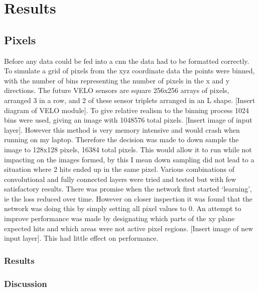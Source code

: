 \chapter{Results}


\graphicspath{{Figs/}}


\section{Pixels} %
Before any data could be fed into a cnn the data had to be formatted correctly. To simulate a grid of pixels from the xyz coordinate data the points were binned, with the number of bins representing the number of pixels in the x and y directions. The future VELO sensors are square 256x256 arrays of pixels, arranged 3 in a row, and 2 of these sensor triplets arranged in an L shape. [Insert diagram of VELO module]. To give relative realism to the binning process 1024 bins were used, giving an image with 1048576 total pixels. [Insert image of input layer]. However this method is very memory intensive and would crash when running on my laptop. Therefore the decision was made to down sample the image to 128x128 pixels, 16384 total pixels. This would allow it to run while not impacting on the images formed, by this I mean down sampling did not lead to a situation where 2 hits ended up in the same pixel. Various combinations of convolutional and fully connected layers were tried and tested but with few satisfactory results. There was promise when the network first started ‘learning’, ie the loss reduced over time. However on closer inspection it was found that the network was doing this by simply setting all pixel values to 0. An attempt to improve performance was made by designating which parts of the xy plane expected hits and which areas were not active pixel regions. [Insert image of new input layer]. This had little effect on performance.

\subsection{Results}

\subsection{Discussion}

